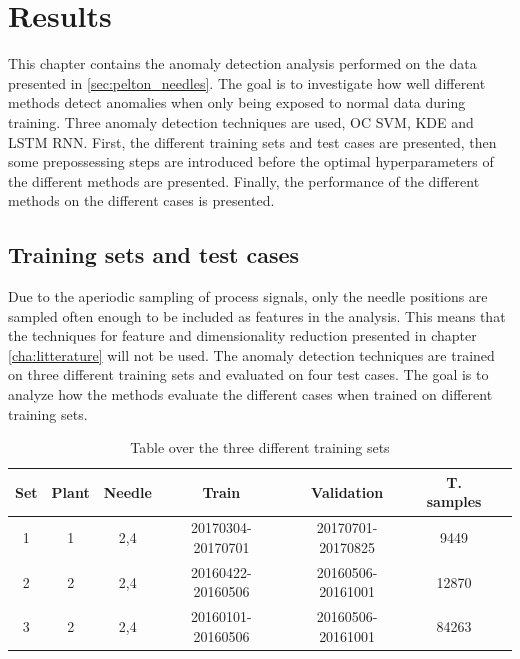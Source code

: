 \chapter{Results}\label{cha:analysis}
This chapter contains the anomaly detection analysis performed on the data presented in \ref{sec:pelton_needles}. The goal is to investigate how well different methods detect anomalies when only being exposed to normal data during training. Three anomaly detection techniques are used, OC SVM, KDE and LSTM RNN. First, the different training sets and test cases are presented, then some prepossessing steps are introduced before the optimal hyperparameters of the different methods are presented. Finally, the performance of the different methods on the different cases is presented.

    \section{Training sets and test cases}
        Due to the aperiodic sampling of process signals, only the needle positions are sampled often enough to be included as features in the analysis. This means that the techniques for feature and dimensionality reduction presented in chapter \ref{cha:litterature} will not be used. The anomaly detection techniques are trained on three different training sets and evaluated on four test cases. The goal is to analyze how the methods evaluate the different cases when trained on different training sets. 
        
        \begin{table}[]
            \centering
            \begin{tabular}{ccccccc}
                \toprule
                \textbf{Set}    & \textbf{Plant}       & \textbf{Needle}   & \textbf{Train}  & \textbf{Validation}        & \textbf{T. samples}\\ \midrule
                1       & 1                    & 2,4        & 20170304-20170701 & 20170701-20170825 & 9449\\ 
                2       & 2                    & 2,4        & 20160422-20160506 & 20160506-20161001 & 12870\\ 
                3       & 2                    & 2,4        & 20160101-20160506 & 20160506-20161001 & 84263\\ \bottomrule
            \end{tabular}
            \caption{Table over the three different training sets}
            \label{tab:training_cases}
        \end{table}
        
